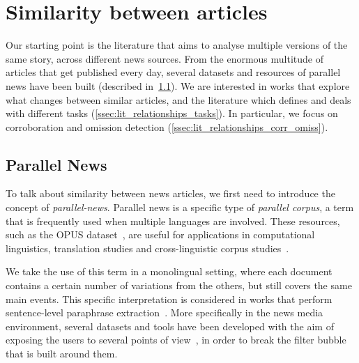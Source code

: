 




\section{\statusgreen Similarity between articles}
\label{sec:lit_relationships}

Our starting point is the literature that aims to analyse multiple versions of the same story, across different news sources.
From the enormous multitude of articles that get published every day, several datasets and resources of parallel news have been built (described in~\ref{ssec:lit_relationships_parallel}).
We are interested in works that explore what changes between similar articles, and the literature which defines and deals with different tasks (\ref{ssec:lit_relationships_tasks}). In particular, we focus on corroboration and omission detection (\ref{ssec:lit_relationships_corr_omiss}).

\subsection{\statusgreen Parallel News}
\label{ssec:lit_relationships_parallel}

To talk about similarity between news articles, we first need to introduce the concept of \emph{\gls{parallel-news}}.
%
Parallel news is a specific type of \emph{parallel corpus}, a term that is frequently used when multiple languages are involved.
These resources, such as the OPUS dataset~\citep{tiedemann2012parallel}, are useful for applications in computational linguistics, translation studies and cross-linguistic corpus studies~\citep{brown1991aligning,ramesh2022samanantar,ziemski2016united,kunchukuttan2017iit,banon2020paracrawl}.

We take the use of this term in a monolingual setting, where each document contains a certain number of variations from the others, but still covers the same main events.
This specific interpretation is considered in works that perform sentence-level paraphrase extraction~\citep{dolan2004unsupervised,zhang2013harvesting}.
More specifically in the news media environment, several datasets and tools have been developed with the aim of exposing the users to several points of view~\citep{bozdag2015breaking}, in order to break the filter bubble~\citep{pariser2011filter}
that is built around them.

